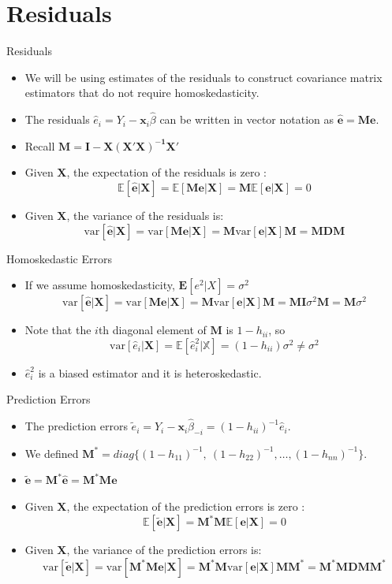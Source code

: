 \documentclass[aspectratio=169, handout]{beamer}
\numberwithin{equation}{section}
\newcommand{\var}{\text{var}}
\begin{document}
\section{Residuals}

\begin{frame}{Residuals}
\begin{itemize}
\item We will be using estimates of the residuals to construct covariance matrix estimators that do not require homoskedasticity.
\item The residuals $\hat{e}_i=Y_i-\bm{x}_i\hat{\beta}$ can be written in vector notation as $\bm{\hat{e}}=\bm{Me}$.  
\item Recall $\bm{M}=\bm{I}-\bm{X(X'X)^{-1}X'}$
\item Given $\bm{X}$, the expectation of the residuals is zero :
$$\mathbb{E}[\bm{\hat{e}}|\bm{X}]=\mathbb{E}[\bm{Me}|\bm{X}]=\bm{M}\mathbb{E}[\bm{e}|\bm{X}]=0$$
\item Given $\bm{X}$, the variance of the residuals is:
$$\var[\bm{\hat{e}}|\bm{X}]=\var[\bm{Me}|\bm{X}]=\bm{M}\var[\bm{e}|\bm{X}]\bm{M}=\bm{MDM}$$

\end{itemize}
\end{frame}
 
 
\begin{frame}{Homoskedastic Errors}
\begin{itemize}
 \item If we assume homoskedasticity, $\bm{E}[e^2|X]=\sigma^2$
$$\var[\bm{\hat{e}}|\bm{X}]=\var[\bm{Me}|\bm{X}]=\bm{M}\var[\bm{e}|\bm{X}]\bm{M}=\bm{M}\bm{I}\sigma^2 \bm{M}=\bm{M}\sigma^2$$
\item Note that the $i$th diagonal element of $\bm{M}$ is $1-h_{ii}$, so
$$\var[\hat{e}_i|\bm{X}]=\mathbb{E}[\hat{e}^2_i|\mathbb{X}]=(1-h_{ii})\sigma^2\neq \sigma^2$$
\item $\hat{e}^2_i$ is a biased estimator and it is heteroskedastic.
\end{itemize}
\end{frame}
  
\begin{frame}{Prediction Errors}
\begin{itemize}
\item The prediction errors $\tilde{e}_i=Y_i-\bm{x}_i\hat{\beta}_{-i}=(1-h_{ii})^{-1}\hat{e}_i$.
\item We defined $\bm{M^*}=diag\{(1-h_{11})^{-1},\ (1-h_{22})^{-1},\ldots, (1-h_{nn})^{-1}\}$.
\item $\bm{\tilde{e}}=\bm{M}^*\bm{\hat{e}}=\bm{M}^*\bm{Me}$
\item Given $\bm{X}$, the expectation of the prediction errors is zero :
$$\mathbb{E}[\bm{\tilde{e}}|\bm{X}]=\bm{M^*M}\mathbb{E}[\bm{e}|\bm{X}]=0$$
\item Given $\bm{X}$, the variance of the prediction errors is:
 $$\var[\bm{\tilde{e}}|\bm{X}]=\var[\bm{M^*Me}|\bm{X}]=\bm{M^*M}\var[\bm{e}|\bm{X}]\bm{MM^*}=\bm{M^*MDMM^*}$$
\end{itemize}
\end{frame}
 
\end{document}
